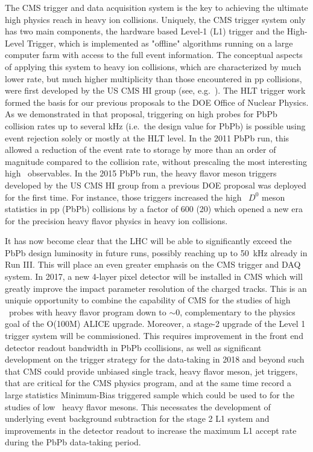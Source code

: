The CMS trigger and data acquisition system is the key to achieving the ultimate high \pt physics reach in heavy ion collisions. Uniquely, the CMS trigger system only has two main components, the hardware based Level-1 (L1) trigger and the High-Level Trigger, which is implemented as "offline" algorithms running on a large computer farm with access to the full event information.  
The conceptual aspects of applying this system to heavy ion collisions, which are characterized by much lower rate, but much higher multiplicity than those encountered in pp collisions, were first developed by the US CMS HI group (see, e.g.\ \cite{Roland:2007is}). The HLT trigger work formed the basis for our previous proposals to the DOE Office of Nuclear Physics. As we demonstrated in that proposal, triggering on high \pt probes for PbPb collision rates up to several kHz (i.e.\ the design value for PbPb) is possible using event rejection solely or mostly at the HLT level. In the 2011 PbPb run, this allowed a reduction of the event rate to storage by more than
an order of magnitude compared to the collision rate, without prescaling the most interesting high \pt\ observables. In the 2015 PbPb run, the heavy flavor meson triggers developed by the US CMS HI group from a previous DOE proposal was deployed for the first time. For instance, those triggers increased the high \pt\ $D^0$ meson statistics in pp (PbPb) collisions by a factor of 600 (20) which opened a new era for the precision heavy flavor physics in heavy ion collisions.

It has now become clear that the LHC will be able to significantly exceed the PbPb design luminosity in future runs, possibly reaching up to 50~kHz already in Run III. This will place an even greater emphasis on the CMS trigger and DAQ system. In 2017, a new 4-layer pixel detector will be installed in CMS which will greatly improve the impact parameter resolution of the charged tracks. This is an uniquie opportunity to combine the capability of CMS for the studies of high \pt\ probes with heavy flavor program down to \pt$\sim 0$, complementary to the physics goal of the O(100M) ALICE upgrade. Moreover, a stage-2 upgrade of the Level 1 trigger system will be commissioned. This requires improvement in the front end detector readout bandwidth in PbPb ccollisions, as well as significant development on the trigger strategy for the data-taking in 2018 and beyond such that CMS could provide unbiased single track, heavy flavor meson, jet triggers, that are critical for the CMS physics program, and at the same time record a large statistics Minimum-Bias triggered sample which could be used to for the studies of low \pt\ heavy flavor mesons. This necessates the development of underlying event background subtraction for the stage 2 L1 system and improvements in the detector readout to increase the maximum L1 accept rate during the PbPb data-taking period.

